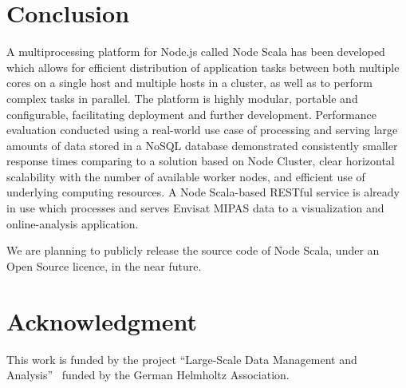 \documentclass[10pt,conference,letterpaper]{IEEEtran}
\begin{document}
\section{Conclusion}

A multiprocessing platform for Node.js called Node Scala has been
developed which allows for efficient distribution of application tasks
between both multiple cores on a single host and multiple hosts in a
cluster, as well as to perform complex tasks in parallel. The platform
is highly modular, portable and configurable, facilitating deployment
and further development. Performance evaluation conducted using a
real-world use case of processing and serving large amounts of data
stored in a NoSQL database demonstrated consistently smaller response
times comparing to a solution based on Node Cluster, clear horizontal
scalability with the number of available worker nodes, and efficient
use of underlying computing resources. A Node Scala-based RESTful
service is already in use which processes and serves Envisat MIPAS
data to a visualization and online-analysis application.

We are planning to publicly release the source code of Node Scala,
under an Open Source licence, in the near future.


\section*{Acknowledgment}
This work is funded by the project ``Large-Scale Data Management and Analysis''~\cite{jung2013oodlc} funded by the German Helmholtz Association.







\end{document}
